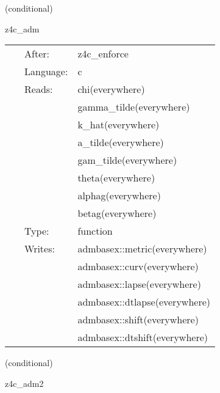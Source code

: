 \vspace{5mm}

   (conditional) 

\hspace{5mm} z4c\_adm 

\hspace{5mm}{\it convert z4c to adm variables } 


\hspace{5mm}

 \begin{tabular*}{160mm}{cll} 
~ & After:  & z4c\_enforce \\ 
~ & Language:  & c \\ 
~ & Reads:  & chi(everywhere) \\ 
~& ~ &gamma\_tilde(everywhere)\\ 
~& ~ &k\_hat(everywhere)\\ 
~& ~ &a\_tilde(everywhere)\\ 
~& ~ &gam\_tilde(everywhere)\\ 
~& ~ &theta(everywhere)\\ 
~& ~ &alphag(everywhere)\\ 
~& ~ &betag(everywhere)\\ 
~ & Type:  & function \\ 
~ & Writes:  & admbasex::metric(everywhere) \\ 
~& ~ &admbasex::curv(everywhere)\\ 
~& ~ &admbasex::lapse(everywhere)\\ 
~& ~ &admbasex::dtlapse(everywhere)\\ 
~& ~ &admbasex::shift(everywhere)\\ 
~& ~ &admbasex::dtshift(everywhere)\\ 
\end{tabular*} 


\vspace{5mm}

   (conditional) 

\hspace{5mm} z4c\_adm2 

\hspace{5mm}{\it calculate second time derivatives of adm variables } 


\hspace{5mm}

